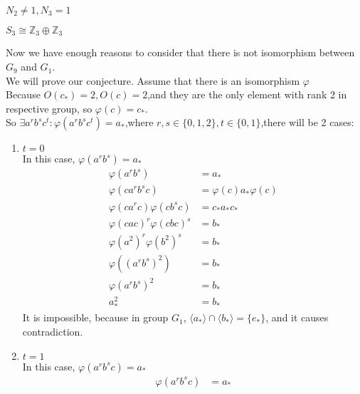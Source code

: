 \documentclass[a4paper,14pt]{article}
\begin{document}
\begin{enumerate}
\begin{item}{$N_2 \neq 1, N_3 = 1$}
\begin{enumerate}
\begin{item}{$S_3\cong \mathbb{Z}_3 \oplus \mathbb{Z}_3$}
\begin{enumerate}
\begin{enumerate}
                            \end{enumerate}
                            Now we have enough reasons to consider that there is not isomorphism between $G_9$ and $G_1$.\\
                            We will prove our conjecture. Assume that there is an isomorphism $\varphi$\\
                            Because $O(c_*)=2, O(c)=2$,and they are the only element with rank 2 in respective group, so $\varphi(c)=c_*$.\\
                            So $\exists a^rb^sc^t: \varphi(a^rb^sc^t)=a_*$,where $r,s \in \{0,1,2\},t \in \{0,1\}$,there will be 2 cases:
                            \begin{enumerate}
                                \item $t = 0$\\
                                    In this case, $\varphi(a^rb^s)=a_*$
                                    \begin{align*}
                                        \varphi(a^rb^s)&=a_*\\
                                        \varphi(ca^rb^sc) &= \varphi(c)a_*\varphi(c)\\
                                        \varphi(ca^rc)\varphi(cb^sc) &= c_*a_*c_*\\
                                        \varphi(cac)^r\varphi(cbc)^s &= b_*\\
                                        \varphi(a^2)^r\varphi(b^2)^s &= b_*\\
                                        \varphi((a^rb^s)^2) &= b_*\\
                                        \varphi(a^rb^s)^2 &= b_*\\
                                        a_*^2 &= b_*
                                    \end{align*}
                                    It is impossible, because in group $G_1$, $\langle a_* \rangle \cap \langle b_* \rangle = \{e_*\}$, and
                                    it causes contradiction. \newpage
                                \item $t = 1$\\
                                    In this case, $\varphi(a^rb^sc)=a_*$
                                    \begin{align*}
                                        \varphi(a^rb^sc)&=a_*\\

\end{align*}
\end{enumerate}
\end{enumerate}
\end{item}
\end{enumerate}
\end{item}
\end{enumerate}
\end{document}
